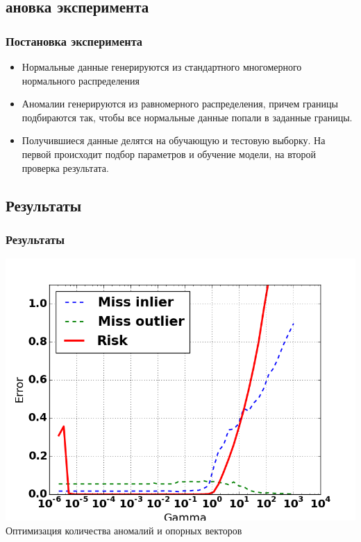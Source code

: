 \documentclass[10pt,pdf]{beamer}
\begin{document}
\subsection{ановка эксперимента}
\begin{frame}\frametitle{Постановка эксперимента}
\begin{itemize}
\item Нормальные данные генерируются из стандартного многомерного нормального распределения

\item Аномалии генерируются из равномерного распределения, причем границы подбираются так, чтобы все нормальные данные попали в заданные границы.

\item Получившиеся данные делятся на обучающую и тестовую выборку. На первой происходит подбор параметров и обучение модели, на второй проверка результата.
\end{itemize}
\end{frame}


\subsection{Результаты}
\begin{frame}\frametitle{Результаты}
\centering
\includegraphics[scale=0.35]{outlier_fraction}\\
Оптимизация количества аномалий и опорных векторов
\end{frame}
\end{document}
